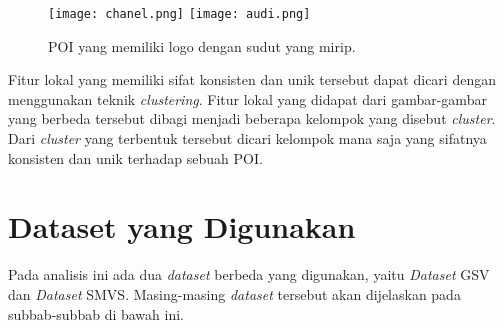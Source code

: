 \begin{figure}[H]
	\centering
	\texttt{[image: chanel.png]}
	\texttt{[image: audi.png]}
	\caption{POI yang memiliki logo dengan sudut yang mirip.}
	\label{fig:logo_tidak_unik}
\end{figure}

Fitur lokal yang memiliki sifat konsisten dan unik tersebut dapat dicari dengan menggunakan teknik \textit{clustering}. Fitur lokal yang didapat dari gambar-gambar yang berbeda tersebut dibagi menjadi beberapa kelompok yang disebut \textit{cluster}. Dari \textit{cluster} yang terbentuk tersebut dicari kelompok mana saja yang sifatnya konsisten dan unik terhadap sebuah POI. 

\section{Dataset yang Digunakan}
Pada analisis ini ada dua \textit{dataset} berbeda yang digunakan, yaitu \textit{Dataset} GSV dan \textit{Dataset} SMVS. Masing-masing \textit{dataset} tersebut akan dijelaskan pada subbab-subbab di bawah ini.
